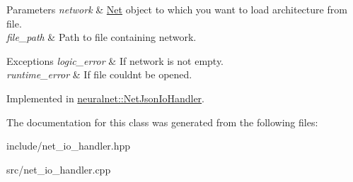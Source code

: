 \begin{DoxyParams}{Parameters}
{\em network} & \hyperlink{classneuralnet_1_1Net}{Net} object to which you want to load architecture from file. \\
\hline
{\em file\+\_\+path} & Path to file containing network. \\
\hline
\end{DoxyParams}

\begin{DoxyExceptions}{Exceptions}
{\em logic\+\_\+error} & If network is not empty. \\
\hline
{\em runtime\+\_\+error} & If file couldn\textquotesingle{}t be opened. \\
\hline
\end{DoxyExceptions}


Implemented in \hyperlink{classneuralnet_1_1NetJsonIoHandler_af048bd4061be6b8e78d79b54680d9434}{neuralnet\+::\+Net\+Json\+Io\+Handler}.



The documentation for this class was generated from the following files\+:\begin{DoxyCompactItemize}
\item 
include/net\+\_\+io\+\_\+handler.\+hpp\item 
src/net\+\_\+io\+\_\+handler.\+cpp\end{DoxyCompactItemize}
